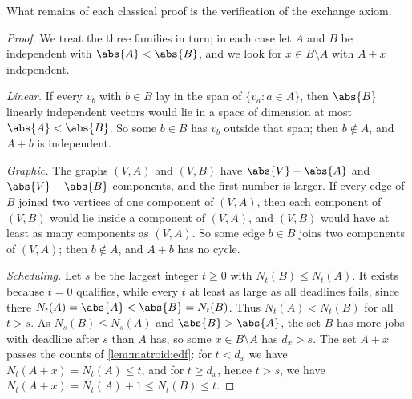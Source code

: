 \begin{refsection}
What remains of each classical proof is the verification of the exchange axiom.


\begin{proof}
We treat the three families in turn; in each case let $A$ and $B$ be independent with $\abs{A}<\abs{B}$, and we look for $x\in B\setminus A$ with $A+x$ independent.

\emph{Linear.} If every $v_b$ with $b\in B$ lay in the span of $\{v_a: a\in A\}$, then $\abs{B}$ linearly independent vectors would lie in a space of dimension at most $\abs{A}<\abs{B}$. So some $b\in B$ has $v_b$ outside that span; then $b\notin A$, and $A+b$ is independent.

\emph{Graphic.} The graphs $(V,A)$ and $(V,B)$ have $\abs{V}-\abs{A}$ and $\abs{V}-\abs{B}$ components, and the first number is larger. If every edge of $B$ joined two vertices of one component of $(V,A)$, then each component of $(V,B)$ would lie inside a component of $(V,A)$, and $(V,B)$ would have at least as many components as $(V,A)$. So some edge $b\in B$ joins two components of $(V,A)$; then $b\notin A$, and $A+b$ has no cycle.

\emph{Scheduling.} Let $s$ be the largest integer $t\ge0$ with $N_t(B)\le N_t(A)$. It exists because $t=0$ qualifies, while every $t$ at least as large as all deadlines fails, since there $N_t(A)=\abs{A}<\abs{B}=N_t(B)$. Thus $N_t(A)<N_t(B)$ for all $t>s$. As $N_s(B)\le N_s(A)$ and $\abs{B}>\abs{A}$, the set $B$ has more jobs with deadline after $s$ than $A$ has, so some $x\in B\setminus A$ has $d_x>s$. The set $A+x$ passes the counts of \cref{lem:matroid:edf}: for $t<d_x$ we have $N_t(A+x)=N_t(A)\le t$, and for $t\ge d_x$, hence $t>s$, we have $N_t(A+x)=N_t(A)+1\le N_t(B)\le t$.
\end{proof}



\end{refsection}
